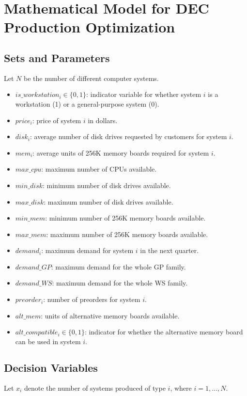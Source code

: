 \documentclass{article}
\begin{document}
\section*{Mathematical Model for DEC Production Optimization}

\subsection*{Sets and Parameters}
Let \( N \) be the number of different computer systems.
\begin{itemize}
    \item \( is\_workstation_i \in \{0, 1\} \): indicator variable for whether system \( i \) is a workstation (1) or a general-purpose system (0).
    \item \( price_i \): price of system \( i \) in dollars.
    \item \( disk_i \): average number of disk drives requested by customers for system \( i \).
    \item \( mem_i \): average units of 256K memory boards required for system \( i \).
    \item \( max\_cpu \): maximum number of CPUs available.
    \item \( min\_disk \): minimum number of disk drives available.
    \item \( max\_disk \): maximum number of disk drives available.
    \item \( min\_mem \): minimum number of 256K memory boards available.
    \item \( max\_mem \): maximum number of 256K memory boards available.
    \item \( demand_i \): maximum demand for system \( i \) in the next quarter.
    \item \( demand\_GP \): maximum demand for the whole GP family.
    \item \( demand\_WS \): maximum demand for the whole WS family.
    \item \( preorder_i \): number of preorders for system \( i \).
    \item \( alt\_mem \): units of alternative memory boards available.
    \item \( alt\_compatible_i \in \{0, 1\} \): indicator for whether the alternative memory board can be used in system \( i \).
\end{itemize}

\subsection*{Decision Variables}
Let \( x_i \) denote the number of systems produced of type \( i \), where \( i = 1, \ldots, N \).
\end{document}
